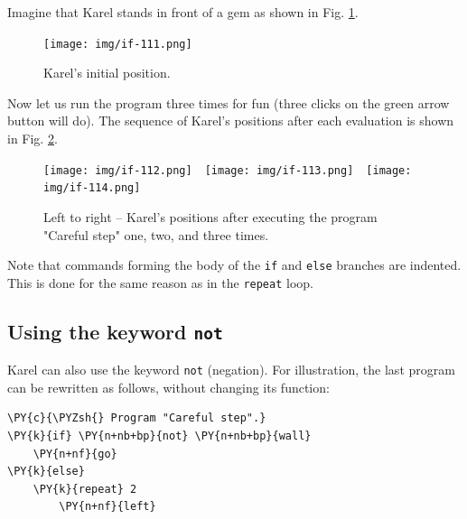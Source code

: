 \noindent
Imagine that Karel stands in front of a gem as shown in Fig. \ref{fig:if-111}.
\newpage

\begin{figure}[!ht]
\begin{center}
\texttt{[image: img/if-111.png]}
\vspace{-0mm}
\caption{Karel's initial position.}
\label{fig:if-111}
\end{center}
\end{figure}
\noindent
Now let us run the program three times for fun (three clicks on the green arrow button 
will do). The sequence of Karel's positions after each evaluation is shown in 
Fig. \ref{fig:if-112}.

\begin{figure}[!ht]
\begin{center}
\texttt{[image: img/if-112.png]}\ \ 
\texttt{[image: img/if-113.png]}\ \ 
\texttt{[image: img/if-114.png]}
\vspace{-0mm}
\caption{Left to right -- Karel's positions after executing the program "Careful step" one, two, and three times.}
\label{fig:if-112}
\vspace{-4mm}
\end{center}
\end{figure}
\noindent

\begin{gbox}
\begin{center}
Note that commands forming the body of the {\tt if} and {\tt else} branches are indented.
This is done for the same reason as in the {\tt repeat} loop. 
\end{center}
\end{gbox}

\subsection{Using the keyword {\tt not}}

Karel can also use the keyword {\tt not} (negation). For illustration, the last 
program can be rewritten as follows, without changing its function:\\

\begin{bbox}
\begin{Verbatim}[commandchars=\\\{\}]
\PY{c}{\PYZsh{} Program "Careful step".}
\PY{k}{if} \PY{n+nb+bp}{not} \PY{n+nb+bp}{wall}
    \PY{n+nf}{go}
\PY{k}{else}
    \PY{k}{repeat} 2
        \PY{n+nf}{left}
\end{Verbatim}
\end{bbox}

